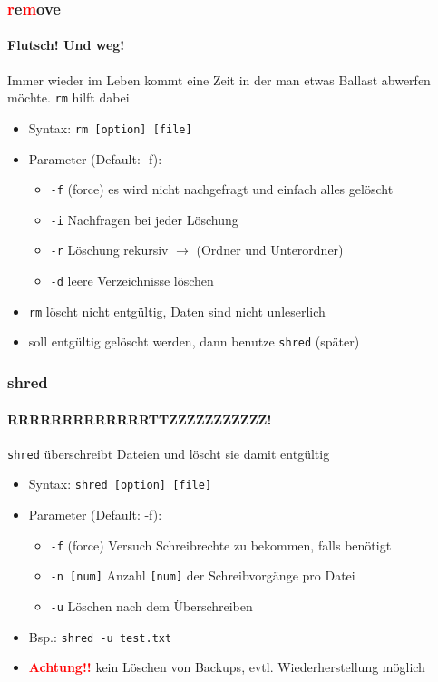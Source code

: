 \documentclass[12pt,utf8, handout]{beamer}
\begin{document}
\begin{frame}
\frametitle{\textcolor{red}{r}e\textcolor{red}{m}ove}
\framesubtitle{\textcolor{ownDarkOr}{Flutsch! Und weg!}}
Immer wieder im Leben kommt eine Zeit in der man etwas Ballast abwerfen möchte.  
\texttt{rm} hilft dabei
\begin{itemize}[<+->]
	\item Syntax: \texttt{rm [option] [file]}
	\item Parameter (Default: -f):
	\begin{itemize}[<+->]
		\item \texttt{-f} (force) es wird nicht nachgefragt und einfach alles gelöscht
		\item \texttt{-i} Nachfragen bei jeder Löschung
		\item \texttt{-r} Löschung rekursiv $\to$ (Ordner und Unterordner)
		\item \texttt{-d} leere Verzeichnisse löschen
	\end{itemize}
	\item \texttt{rm} löscht nicht entgültig, Daten sind nicht unleserlich
	\item soll entgültig gelöscht werden, dann benutze \texttt{shred} (später)
\end{itemize}
\end{frame}

\begin{frame}
\frametitle{shred}
\framesubtitle{\textcolor{ownDarkOr}{RRRRRRRRRRRRRTTZZZZZZZZZZZ!}}
\texttt{shred} überschreibt Dateien und löscht sie damit entgültig
\begin{itemize}
	\item Syntax: \texttt{shred [option] [file]}
	\item Parameter (Default: -f):
	\begin{itemize}[<+->]
		\item \texttt{-f} (force) Versuch Schreibrechte zu bekommen, falls benötigt
		\item \texttt{-n [num]} Anzahl \texttt{[num]} der Schreibvorgänge pro Datei
		\item \texttt{-u} Löschen nach dem Überschreiben
	\end{itemize}
	\item Bsp.: \texttt{shred -u test.txt}
	\item \textbf{\textcolor{red}{Achtung!!}} kein Löschen von Backups, evtl. Wiederherstellung möglich
\end{itemize}
\end{frame}
\end{document}
